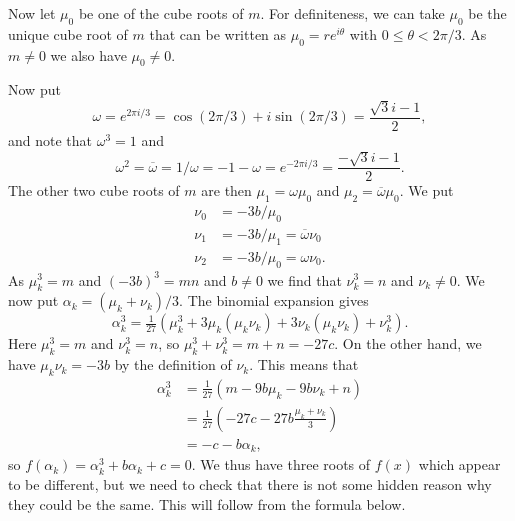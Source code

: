 \documentclass{amsart}
\newcommand{\al}        {\alpha}
\newcommand{\tht}       {\theta}
\newcommand{\om}        {\omega}
\newcommand{\omb}	{\overline{\omega}}
\renewcommand{\:}{\colon}
\theoremstyle{definition}
\begin{document}
Now let $\mu_0$ be one of the cube roots of $m$.  For definiteness, we
can take $\mu_0$ be the unique cube root of $m$ that can be written as
$\mu_0=re^{i\tht}$ with $0\leq\tht<2\pi/3$.  As $m\neq 0$ we also have
$\mu_0\neq 0$.

Now put 
\[ \om = e^{2\pi i/3} = \cos(2\pi/3) + i\sin(2\pi/3) =
     \frac{\sqrt{3}i-1}{2},
\]
and note that $\om^3=1$ and 
\[ \om^2 = \omb = 1/\om = -1-\om = e^{-2\pi i/3} =
     \frac{-\sqrt{3}i-1}{2}.
\]
The other two cube roots of $m$ are then $\mu_1=\om\mu_0$ and
$\mu_2=\omb\mu_0$.  We put 
\begin{align*}
 \nu_0 &= -3b/\mu_0 \\
 \nu_1 &= -3b/\mu_1 = \omb\nu_0 \\
 \nu_2 &= -3b/\mu_0 = \om\nu_0.
\end{align*}
As $\mu_k^3=m$ and $(-3b)^3=mn$ and $b\neq 0$ we find that
$\nu_k^3=n$ and $\nu_k\neq 0$.  We now put 
$\al_k=(\mu_k+\nu_k)/3$.  The binomial expansion gives
\[
 \al_k^3 = \tfrac{1}{27}
    (\mu_k^3 + 3\mu_k(\mu_k\nu_k) + 3\nu_k(\mu_k\nu_k) + \nu_k^3).
\]
Here $\mu_k^3=m$ and $\nu_k^3=n$, so $\mu_k^3+\nu_k^3=m+n=-27c$.  On
the other hand, we have $\mu_k\nu_k=-3b$ by the definition of
$\nu_k$.  This means that
\begin{align*}
 \al_k^3 &= \tfrac{1}{27} (m - 9b\mu_k -9b\nu_k + n) \\
  &= \tfrac{1}{27}(-27c - 27b \frac{\mu_k+\nu_k}{3}) \\
  &= -c-b\al_k,
\end{align*}
so $f(\al_k)=\al_k^3+b\al_k+c=0$.  We thus have three roots of $f(x)$
which appear to be different, but we need to check that there is not
some hidden reason why they could be the same.  This will follow from
the formula below.
\end{document}
